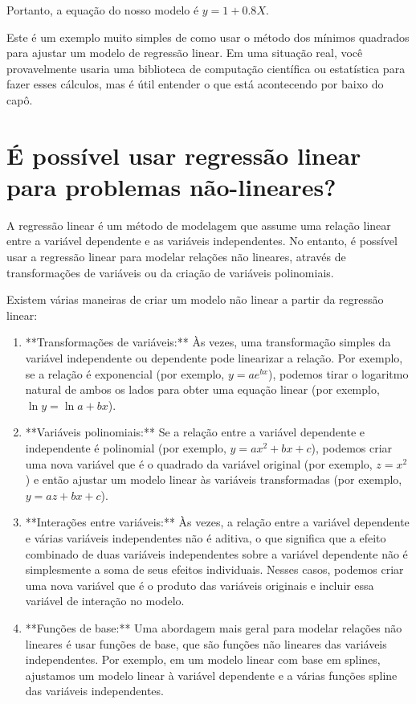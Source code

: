 \documentclass[12pt,a4paper, brazil]{article}
\begin{document}
Portanto, a equação do nosso modelo é $y = 1 + 0.8X$.

Este é um exemplo muito simples de como usar o método dos mínimos quadrados para ajustar um modelo de regressão linear. Em uma situação real, você provavelmente usaria uma biblioteca de computação científica ou estatística para fazer esses cálculos, mas é útil entender o que está acontecendo por baixo do capô.

\section{É possível usar regressão linear para problemas não-lineares?}

A regressão linear é um método de modelagem que assume uma relação linear entre a variável dependente e as variáveis independentes. No entanto, é possível usar a regressão linear para modelar relações não lineares, através de transformações de variáveis ou da criação de variáveis polinomiais.

Existem várias maneiras de criar um modelo não linear a partir da regressão linear:
\begin{enumerate}
  \item **Transformações de variáveis:** Às vezes, uma transformação simples da variável independente ou dependente pode linearizar a relação. Por exemplo, se a relação é exponencial (por exemplo, $y = ae^{bx}$), podemos tirar o logaritmo natural de ambos os lados para obter uma equação linear (por exemplo, $\ln y = \ln a + bx$).
  
  \item **Variáveis polinomiais:** Se a relação entre a variável dependente e independente é polinomial (por exemplo, $y = ax^2 + bx + c$), podemos criar uma nova variável que é o quadrado da variável original (por exemplo, $z = x^2$) e então ajustar um modelo linear às variáveis transformadas (por exemplo, $y = az + bx + c$).
  
  \item **Interações entre variáveis:** Às vezes, a relação entre a variável dependente e várias variáveis independentes não é aditiva, o que significa que a efeito combinado de duas variáveis independentes sobre a variável dependente não é simplesmente a soma de seus efeitos individuais. Nesses casos, podemos criar uma nova variável que é o produto das variáveis originais e incluir essa variável de interação no modelo.
  
  \item **Funções de base:** Uma abordagem mais geral para modelar relações não lineares é usar funções de base, que são funções não lineares das variáveis independentes. Por exemplo, em um modelo linear com base em splines, ajustamos um modelo linear à variável dependente e a várias funções spline das variáveis independentes.
  
\end{enumerate}
\end{document}
